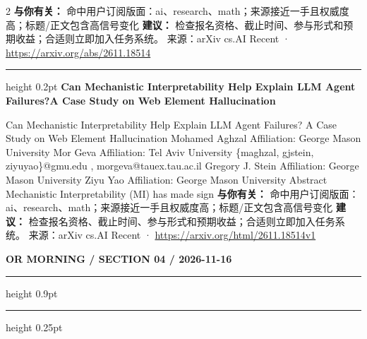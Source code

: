 \documentclass[10.5pt]{ctexart}
\begin{document}
\begin{multicols}{2}
\textbf{与你有关：} 命中用户订阅版面：ai、research、math；来源接近一手且权威度高；标题/正文包含高信号变化
\textbf{建议：} 检查报名资格、截止时间、参与形式和预期收益；合适则立即加入任务系统。
{\footnotesize\color{ormuted} 来源：arXiv cs.AI Recent · \url{https://arxiv.org/abs/2611.18514}}
\vspace{2mm}
\hrule height 0.2pt
\vspace{2mm}
{\large\bfseries Can Mechanistic Interpretability Help Explain LLM Agent Failures?A Case Study on Web Element Hallucination}\par
Can Mechanistic Interpretability Help Explain LLM Agent Failures? A Case Study on Web Element Hallucination Mohamed Aghzal Affiliation: George Mason University Mor Geva Affiliation: Tel Aviv University \{maghzal, gjstein, ziyuyao\}@gmu.edu , morgeva@tauex.tau.ac.il Gregory J. Stein Affiliation: George Mason University Ziyu Yao Affiliation: George Mason University Abstract Mechanistic Interpretability (MI) has made sign
\textbf{与你有关：} 命中用户订阅版面：ai、research、math；来源接近一手且权威度高；标题/正文包含高信号变化
\textbf{建议：} 检查报名资格、截止时间、参与形式和预期收益；合适则立即加入任务系统。
{\footnotesize\color{ormuted} 来源：arXiv cs.AI Recent · \url{https://arxiv.org/html/2611.18514v1}}
\end{multicols}
\newpage
{\small\bfseries OR MORNING / SECTION 04 / 2026-11-16}
\vspace{2mm}
\hrule height 0.9pt
\vspace{1.5mm}
\hrule height 0.25pt
\vspace{4mm}
\end{document}

